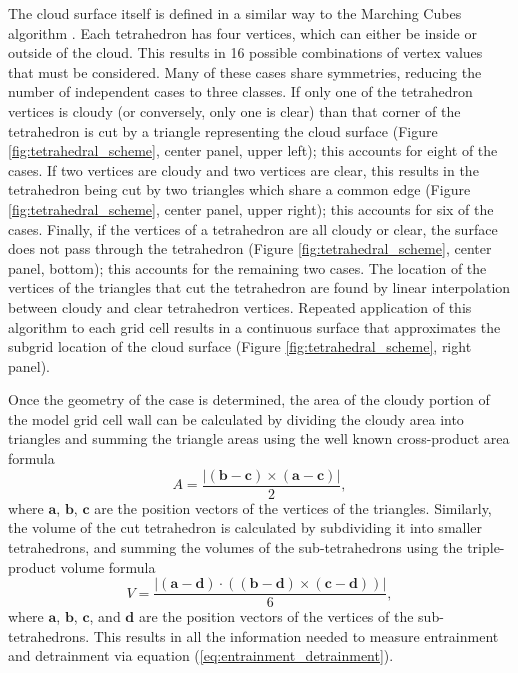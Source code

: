 \documentclass[12pt]{article}
\begin{document}
The cloud surface itself is defined in a similar way to the Marching Cubes 
algorithm \citep{Lorensen1987}.  Each tetrahedron has four vertices, which can 
either be inside or outside of the cloud.  This results in 16 possible 
combinations of vertex values that must be considered.  Many of these cases 
share symmetries, reducing the number of independent cases to three classes.  
If only one of the tetrahedron vertices is cloudy (or conversely, only one is 
clear) than that corner of the tetrahedron is cut by a triangle representing 
the cloud surface (Figure \ref{fig:tetrahedral_scheme}, center panel, 
upper left); this accounts for eight of the cases.  If two vertices are cloudy 
and two vertices are clear, this results in the tetrahedron being cut by two 
triangles which share a common edge (Figure \ref{fig:tetrahedral_scheme}, 
center panel, upper right); this accounts for six of the cases.  Finally, if 
the vertices of a tetrahedron are all cloudy or clear, the surface does not 
pass through the tetrahedron (Figure \ref{fig:tetrahedral_scheme}, center 
panel, bottom); this accounts for the remaining two cases.  The location of the 
vertices of the triangles that cut the tetrahedron are found by linear 
interpolation between cloudy and clear tetrahedron vertices.  Repeated 
application of this algorithm to each grid cell results in a continuous surface 
that approximates the subgrid location of the cloud surface (Figure 
\ref{fig:tetrahedral_scheme}, right panel).

Once the geometry of the case is determined, the area of the cloudy portion of
the model grid cell wall can be calculated by dividing the cloudy area into 
triangles and summing the triangle areas using the well known cross-product 
area formula
\begin{equation}
A = \frac{|(\mathbf{b - c}) \times (\mathbf{a - c})|}{2},
\end{equation}
where $\mathbf{a}$, $\mathbf{b}$, $\mathbf{c}$ are the position vectors of the 
vertices of the triangles.  Similarly, the volume of the cut tetrahedron is 
calculated by subdividing it into smaller tetrahedrons, and summing the volumes 
of the sub-tetrahedrons using the triple-product volume formula 
\citep{Harris1998}
\begin{equation}
V = \frac{|(\mathbf{a - d}) \cdot ((\mathbf{b - d}) \times (\mathbf{c - d}))|}{6},
\end{equation}
where $\mathbf{a}$, $\mathbf{b}$, $\mathbf{c}$, and $\mathbf{d}$ are the 
position vectors of the vertices of the sub-tetrahedrons.  This results in 
all the information needed to measure entrainment and detrainment via equation
(\ref{eq:entrainment_detrainment}).
\end{document}
